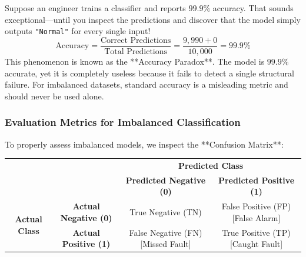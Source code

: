 Suppose an engineer trains a classifier and reports $99.9\%$ accuracy. That sounds exceptional---until you inspect the predictions and discover that the model simply outputs \texttt{"Normal"} for every single input!
\begin{equation}
\text{Accuracy} = \frac{\text{Correct Predictions}}{\text{Total Predictions}} = \frac{9{,}990 + 0}{10{,}000} = 99.9\%
\end{equation}
This phenomenon is known as the **Accuracy Paradox**. The model is $99.9\%$ accurate, yet it is completely useless because it fails to detect a single structural failure. For imbalanced datasets, standard accuracy is a misleading metric and should never be used alone.

\subsubsection{Evaluation Metrics for Imbalanced Classification}
To properly assess imbalanced models, we inspect the **Confusion Matrix**:

\begin{center}
\renewcommand{\arraystretch}{1.3}
\begin{tabular}{cc|cc}
\multicolumn{2}{c}{} & \multicolumn{2}{c}{\textbf{Predicted Class}} \\
& & \textbf{Predicted Negative (0)} & \textbf{Predicted Positive (1)} \\
\hline
\multirow{2}{*}{\textbf{Actual Class}} 
& \textbf{Actual Negative (0)} & True Negative (TN) & False Positive (FP) [False Alarm] \\
& \textbf{Actual Positive (1)} & False Negative (FN) [Missed Fault] & True Positive (TP) [Caught Fault] \\
\end{tabular}
\end{center}

